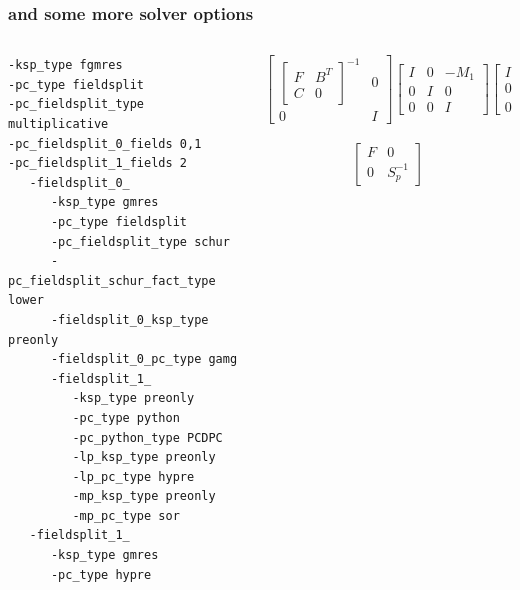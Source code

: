 \documentclass[presentation,aspectratio=43]{beamer}
\begin{document}
\begin{frame}[fragile,t]
  \frametitle{and some more solver options}
  \begin{columns}[t]
    \begin{column}{0.49\textwidth}
\begin{verbatim}
-ksp_type fgmres
-pc_type fieldsplit
-pc_fieldsplit_type multiplicative
-pc_fieldsplit_0_fields 0,1
-pc_fieldsplit_1_fields 2
   -fieldsplit_0_
      -ksp_type gmres
      -pc_type fieldsplit
      -pc_fieldsplit_type schur
      -pc_fieldsplit_schur_fact_type lower
      -fieldsplit_0_ksp_type preonly
      -fieldsplit_0_pc_type gamg
      -fieldsplit_1_
         -ksp_type preonly
         -pc_type python
         -pc_python_type PCDPC
         -lp_ksp_type preonly
         -lp_pc_type hypre
         -mp_ksp_type preonly
         -mp_pc_type sor
   -fieldsplit_1_
      -ksp_type gmres
      -pc_type hypre
\end{verbatim}
    \end{column}
    \hspace{0.02\textwidth}
    \begin{column}{0.49\textwidth}
      {\tiny
        \begin{equation*}
          \begin{bmatrix}
            \begin{bmatrix}
              F & B^T\\
              C & 0
            \end{bmatrix}^{-1} & 0\\
            0 & I
          \end{bmatrix}
          \begin{bmatrix}
            I & 0 & -M_1\\
            0 & I & 0 \\
            0 & 0 & I
          \end{bmatrix}
          \begin{bmatrix}
            I & 0 & 0\\
            0 & I & 0\\
            0 & 0 & K^{-1}
          \end{bmatrix}
        \end{equation*}
        \\[\baselineskip]
        \begin{equation*}
          \begin{bmatrix}
            F & 0 \\
            0 & S_p^{-1}

\end{bmatrix}
\end{equation*}}
\end{column}
\end{columns}
\end{frame}
\end{document}
